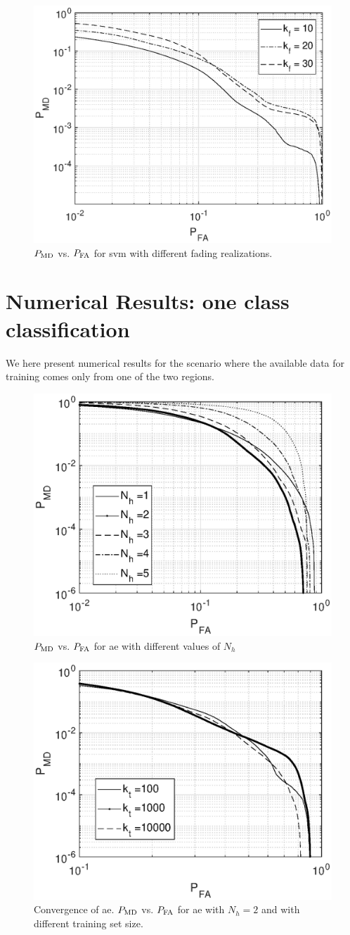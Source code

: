 \documentclass[draftcls,onecolumn,12pt]{IEEEtran}
\begin{document}
\begin{figure}[t]
    \centering
    \includegraphics[width=0.5\columnwidth]{res_avg_nFading_SVM.eps}
    \caption{$P_{\rm MD}$ vs. $P_{\rm FA}$ for \ac{svm} with different fading realizations.}
    \label{fig:faded}
\end{figure}

\section{Numerical Results: one class classification}
We here present numerical results for the scenario where the available data for training comes only from one of the two regions. 

\begin{figure}
    \centering
    \includegraphics[width=0.5\columnwidth]{res_ae_onNeur.eps}
    \caption{$P_{\rm MD}$ vs. $P_{\rm FA}$ for \ac{ae} with different values of $N_h$}
    \label{fig:faded}
\end{figure}


\begin{figure}
    \centering
    \includegraphics[width=0.5\columnwidth]{res_avg_nTrain_oneClass.eps}
    \caption{Convergence of \ac{ae}. $P_{\rm MD}$ vs. $P_{\rm FA}$ for \ac{ae} with $N_h = 2$ and with different training set size.}
    \label{fig:faded}
\end{figure}
\end{document}
